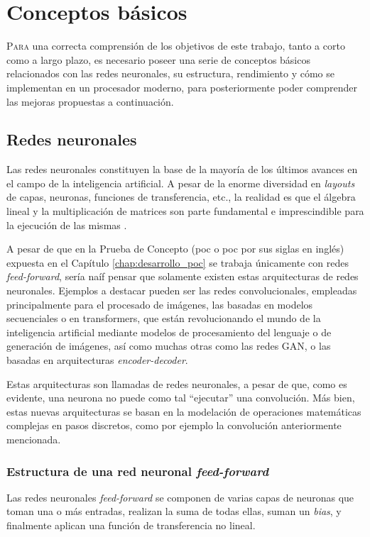 \chapter{Conceptos básicos}
\label{chap:conceptos_basicos}

\lettrine{P}{ara} una correcta comprensión de los objetivos de este trabajo, tanto a corto como a largo plazo, es necesario poseer una serie de conceptos básicos relacionados con las redes neuronales, su estructura, rendimiento y cómo se implementan en un procesador moderno, para posteriormente poder comprender las mejoras propuestas a continuación.

\section{Redes neuronales}
\label{sec:redes_neuronales}
Las redes neuronales constituyen la base de la mayoría de los últimos avances en el campo de la inteligencia artificial. A pesar de la enorme diversidad en \textit{layouts} de capas, neuronas, funciones de transferencia, etc., la realidad es que el álgebra lineal y la multiplicación de matrices son parte fundamental e imprescindible para la ejecución de las mismas \cite[Figura 3.4]{deep_learning_for_computer_architects}.

A pesar de que en la Prueba de Concepto (\acrlong{poc} o \acrshort{poc} por sus siglas en inglés) expuesta en el Capítulo \ref{chap:desarrollo_poc} se trabaja únicamente con redes \textit{feed-forward}, sería naíf pensar que solamente existen estas arquitecturas de redes neuronales. Ejemplos a destacar pueden ser las redes convolucionales, empleadas principalmente para el procesado de imágenes, las basadas en modelos secuenciales o en transformers, que están revolucionando el mundo de la inteligencia artificial mediante modelos de procesamiento del lenguaje o de generación de imágenes, así como muchas otras como las redes GAN, o las basadas en arquitecturas \textit{encoder-decoder}.

Estas arquitecturas son llamadas de redes neuronales, a pesar de que, como es evidente, una neurona no puede como tal ``ejecutar'' una convolución. Más bien, estas nuevas arquitecturas se basan en la modelación de operaciones matemáticas complejas en pasos discretos, como por ejemplo la convolución anteriormente mencionada.

\subsection{Estructura de una red neuronal \textit{feed-forward}}
\label{ssec:estructura_red_neuronal_ff}
Las redes neuronales \textit{feed-forward} se componen de varias capas de neuronas que toman una o más entradas, realizan la suma de todas ellas, suman un \textit{bias}, y finalmente aplican una función de transferencia no lineal.


